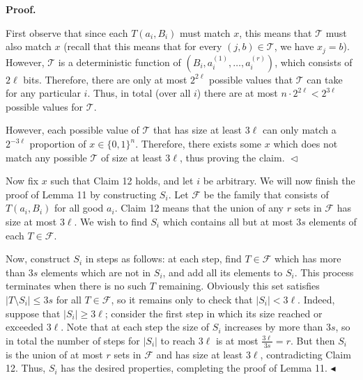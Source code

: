 \par\medskip\noindent\textbf{
\textbf{Proof}.}\par




First observe that since each $T(a_{i},B_{i})$ must match $x$, this means that ${\mathcal{T}}$ must also match $x$ (recall that this means that for every $(j,b)\in{\mathcal{T}}$, we have $x_{j}=b$). However, ${\mathcal{T}}$ is a deterministic function of $(B_{i},a_{i}^{(1)},\dots,a_{i}^{(r)})$, which consists of $2\ell$ bits. Therefore, there are only at most $2^{2\ell}$ possible values that ${\mathcal{T}}$ can take for any particular $i$. Thus, in total (over all $i$) there are at most $n\cdot 2^{2\ell}<2^{3\ell}$ possible values for ${\mathcal{T}}$.\par




However, each possible value of ${\mathcal{T}}$ that has size at least $3\ell$ can only match a $2^{-3\ell}$ proportion of $x\in\{0,1\}^{n}$. Therefore, there exists some $x$ which does not match any possible ${\mathcal{T}}$ of size at least $3\ell$, thus proving the claim.
$\vartriangleleft$\par




Now fix $x$ such that Claim 12 holds, and let $i$ be arbitrary. We will now finish the proof of Lemma 11 by constructing $S_{i}$. Let ${\mathcal{F}}$ be the family that consists of $T(a_{i},B_{i})$ for all good $a_{i}$. Claim 12 means that the union of any $r$ sets in ${\mathcal{F}}$ has size at most $3\ell$. We wish to find $S_{i}$ which contains all but at most $3s$ elements of each $T\in{\mathcal{F}}$.\par




Now, construct $S_{i}$ in steps as follows: at each step, find $T\in{\mathcal{F}}$ which has more than $3s$ elements which are not in $S_{i}$, and add all its elements to $S_{i}$. This process terminates when there is no such $T$ remaining. Obviously this set satisfies $|T\setminus S_{i}|\leq 3s$ for all $T\in{\mathcal{F}}$, so it remains only to check that $|S_{i}|<3\ell$. Indeed, suppose that $|S_{i}|\geq 3\ell$; consider the first step in which its size reached or exceeded $3\ell$. Note that at each step the size of $S_{i}$ increases by more than $3s$, so in total the number of steps for $|S_{i}|$ to reach $3\ell$ is at most $\frac{3\ell}{3s}=r$. But then $S_{i}$ is the union of at most $r$ sets in ${\mathcal{F}}$ and has size at least $3\ell$, contradicting Claim 12. Thus, $S_{i}$ has the desired properties, completing the proof of Lemma 11.
$\blacktriangleleft$\par




